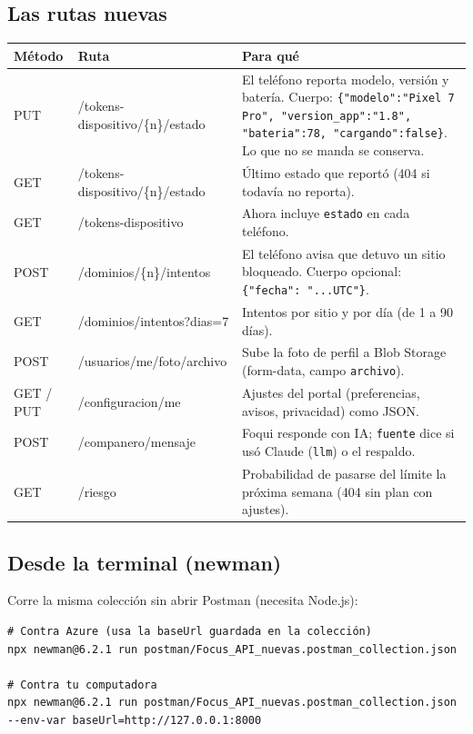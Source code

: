 \documentclass[11pt,a4paper]{article}
\begin{document}
\subsection{Las rutas nuevas}
\begin{center}
\small
\renewcommand{\arraystretch}{1.25}
\begin{tabularx}{\textwidth}{l >{\ttfamily\raggedright\arraybackslash}p{5.7cm} X}
\toprule
\textbf{Método} & \normalfont\bfseries Ruta & \textbf{Para qué} \\
\midrule
PUT & /tokens-dispositivo/\{n\}/estado & El teléfono reporta modelo, versión y batería. Cuerpo: \texttt{\{"modelo":"Pixel 7 Pro", "version\_app":"1.8", "bateria":78, "cargando":false\}}. Lo que no se manda se conserva. \\
GET & /tokens-dispositivo/\{n\}/estado & Último estado que reportó (404 si todavía no reporta). \\
GET & /tokens-dispositivo & Ahora incluye \texttt{estado} en cada teléfono. \\
POST & /dominios/\{n\}/intentos & El teléfono avisa que detuvo un sitio bloqueado. Cuerpo opcional: \texttt{\{"fecha": "...UTC"\}}. \\
GET & /dominios/intentos?dias=7 & Intentos por sitio y por día (de 1 a 90 días). \\
POST & /usuarios/me/foto/archivo & Sube la foto de perfil a Blob Storage (form-data, campo \texttt{archivo}). \\
GET / PUT & /configuracion/me & Ajustes del portal (preferencias, avisos, privacidad) como JSON. \\
POST & /companero/mensaje & Foqui responde con IA; \texttt{fuente} dice si usó Claude (\texttt{llm}) o el respaldo. \\
GET & /riesgo & Probabilidad de pasarse del límite la próxima semana (404 sin plan con ajustes). \\
\bottomrule
\end{tabularx}
\end{center}

\subsection{Desde la terminal (newman)}
Corre la misma colección sin abrir Postman (necesita Node.js):
\begin{lstlisting}[language=texto]
# Contra Azure (usa la baseUrl guardada en la colección)
npx newman@6.2.1 run postman/Focus_API_nuevas.postman_collection.json

# Contra tu computadora
npx newman@6.2.1 run postman/Focus_API_nuevas.postman_collection.json --env-var baseUrl=http://127.0.0.1:8000
\end{lstlisting}
\end{document}
